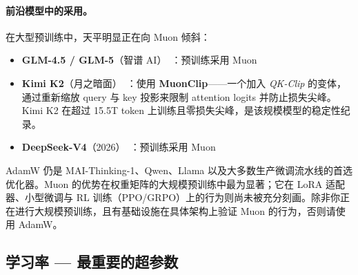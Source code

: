 \paragraph{前沿模型中的采用。}
在大型预训练中，天平明显正在向 Muon 倾斜：
\begin{itemize}
  \item \textbf{GLM-4.5 / GLM-5}（智谱 AI）~\cite{glm45_2025, glm5_2026}：预训练采用 Muon
  \item \textbf{Kimi K2}（月之暗面）~\cite{kimik2_2025}：使用 \textbf{MuonClip}——一个加入 \emph{QK-Clip} 的变体，通过重新缩放 query 与 key 投影来限制 attention logits 并防止损失尖峰。Kimi K2 在超过 15.5T token 上训练且零损失尖峰，是该规模模型的稳定性纪录。
  \item \textbf{DeepSeek-V4}（2026）~\cite{deepseekv4_2026}：预训练采用 Muon
\end{itemize}

\begin{warningbox}[AdamW 仍是安全默认]
AdamW 仍是 MAI-Thinking-1、Qwen、Llama 以及大多数生产微调流水线的首选优化器。Muon 的优势在权重矩阵的大规模预训练中最为显著；它在 LoRA 适配器、小型微调与 RL 训练（PPO/GRPO）上的行为则尚未被充分刻画。除非你正在进行大规模预训练，且有基础设施在具体架构上验证 Muon 的行为，否则请使用 AdamW。
\end{warningbox}

\newpage
\subsection{学习率 --- 最重要的超参数}
\label{learning-rate-the-most-important-hyperparameter}

